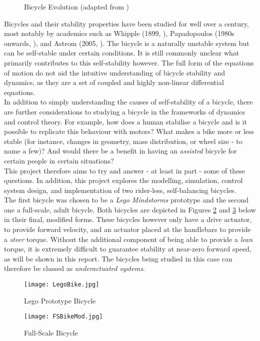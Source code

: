 \begin{figure}[H]
	\centering
    \def\svgwidth{0.9\textwidth}
    
    \caption{Bicycle Evolution (adapted from \cite{bikeevo})}
	\label{fig:bikeevo}
\end{figure}

Bicycles and their stability properties have been studied for well over a century, most notably by academics such as Whipple (1899, \cite{whipple}), Papadopoulos (1980s onwards, \cite{papadopoulos}), and Astrom (2005, \cite{astrom}). The bicycle is a naturally unstable system but can be self-stable under certain conditions. It is still commonly unclear what primarily contributes to this self-stability however. The full form of the equations of motion do not aid the intuitive understanding of bicycle stability and dynamics, as they are a set of coupled and highly non-linear differential equations. \\

\noindent In addition to simply understanding the causes of self-stability of a bicycle, there are further considerations to studying a bicycle in the frameworks of dynamics and control theory. For example, how does a human stabilise a bicycle and is it possible to replicate this behaviour with motors? What makes a bike more or less stable (for instance, changes in geometry, mass distribution, or wheel size - to name a few)? And would there be a benefit in having an \textit{assisted} bicycle for certain people in certain situations? \\

\noindent This project therefore aims to try and answer - at least in part - some of these questions. In addition, this project explores the modelling, simulation, control system design, and implementation of two rider-less, self-balancing bicycles. \\

The first bicycle was chosen to be a \textit{Lego Mindstorms} prototype and the second one a full-scale, adult bicycle. Both bicycles are depicted in Figures \ref{fig:lego} and \ref{fig:fs} below in their final, modified forms. These bicycles however only have a drive actuator, to provide forward velocity, and an actuator placed at the handlebars to provide a \textit{steer} torque. Without the additional component of being able to provide a \textit{lean} torque, it is extremely difficult to guarantee stability at near-zero forward speed, as will be shown in this report. The bicycles being studied in this case can therefore be classed as \textit{underactuated systems}.

\vfill

\begin{figure}[h]
\centering
\texttt{[image: LegoBike.jpg]}
\caption{Lego Prototype Bicycle}
\label{fig:lego}
\end{figure}

\begin{figure}[h]
\centering
\texttt{[image: FSBikeMod.jpg]}
\caption{Full-Scale Bicycle}
\label{fig:fs}
\end{figure}

\newpage